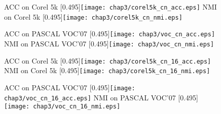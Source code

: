 \begin{figure}[t]
	\centering
					{ACC on  Corel 5k}
					[0.495\textwidth]{\texttt{[image: chap3/corel5k\_cn\_acc.eps]}}
                    \label{fig3:corel5k_cn_acc}
					{NMI on  Corel 5k}
                    [0.495\textwidth]{\texttt{[image: chap3/corel5k\_cn\_nmi.eps]}}
                    \label{fig3:corel5k_cn_nmi}
                    
	\centering
					{ACC on  PASCAL VOC'07}
					[0.495\textwidth]{\texttt{[image: chap3/voc\_cn\_acc.eps]}}
                    \label{fig3:voc_cn_acc}
					{NMI on  PASCAL VOC'07}
					[0.495\textwidth]{\texttt{[image: chap3/voc\_cn\_nmi.eps]}}
                    \label{fig3:voc_cn_nmi}
	\label{fig3:cn}
\end{figure} 


\begin{figure}[t]
	\centering
					{ACC on  Corel 5k}
					[0.495\textwidth]{\texttt{[image: chap3/corel5k\_cn\_16\_acc.eps]}}
                    \label{fig3:corel5k_cn_16_acc}
					{NMI on  Corel 5k}
                    [0.495\textwidth]{\texttt{[image: chap3/corel5k\_cn\_16\_nmi.eps]}}
                    \label{fig3:corel5k_cn_16_nmi}
                    
	\centering
					{ACC on  PASCAL VOC'07}
					[0.495\textwidth]{\texttt{[image: chap3/voc\_cn\_16\_acc.eps]}}
                    \label{fig3:voc_cn_16_acc}
					{NMI on  PASCAL VOC'07}
					[0.495\textwidth]{\texttt{[image: chap3/voc\_cn\_16\_nmi.eps]}}
                    \label{fig3:voc_cn_16_nmi}
	\label{fig3:cn_16}
\end{figure} 


